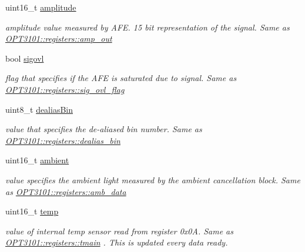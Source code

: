 \begin{DoxyCompactItemize}
uint16\+\_\+t \mbox{\hyperlink{class_o_p_t3101_1_1frame_data_a16b903f0cea13dc66d751beab7271a18}{amplitude}}
\begin{DoxyCompactList}\small\item\em amplitude value measured by A\+FE. 15 bit representation of the signal. Same as \mbox{\hyperlink{class_o_p_t3101_1_1registers_a09663efd977de72bdf7820e0a8f92390}{O\+P\+T3101\+::registers\+::amp\+\_\+out}} \end{DoxyCompactList}\item 
bool \mbox{\hyperlink{class_o_p_t3101_1_1frame_data_a5fde4a7c755e99367d2fc79feb51cf1b}{sigovl}}
\begin{DoxyCompactList}\small\item\em flag that specifies if the A\+FE is saturated due to signal. Same as \mbox{\hyperlink{class_o_p_t3101_1_1registers_ad767a496a0cad5741d575a54a095add3}{O\+P\+T3101\+::registers\+::sig\+\_\+ovl\+\_\+flag}} \end{DoxyCompactList}\item 
uint8\+\_\+t \mbox{\hyperlink{class_o_p_t3101_1_1frame_data_ab29ea3b01c14d5fab239039a61ca4594}{dealias\+Bin}}
\begin{DoxyCompactList}\small\item\em value that specifies the de-\/aliased bin number. Same as \mbox{\hyperlink{class_o_p_t3101_1_1registers_a1faab11698859e9d42e148c1d8cd5d1e}{O\+P\+T3101\+::registers\+::dealias\+\_\+bin}} \end{DoxyCompactList}\item 
uint16\+\_\+t \mbox{\hyperlink{class_o_p_t3101_1_1frame_data_a39ebf8bd06141bef6986e49013d03c35}{ambient}}
\begin{DoxyCompactList}\small\item\em value specifies the ambient light measured by the ambient cancellation block. Same as \mbox{\hyperlink{class_o_p_t3101_1_1registers_ae6b7c86e96cbfb1efe3263caed9de137}{O\+P\+T3101\+::registers\+::amb\+\_\+data}} \end{DoxyCompactList}\item 
uint16\+\_\+t \mbox{\hyperlink{class_o_p_t3101_1_1frame_data_a537975687785cc0fb002dc70384af7ab}{temp}}
\begin{DoxyCompactList}\small\item\em value of internal temp sensor read from register 0x0A. Same as \mbox{\hyperlink{class_o_p_t3101_1_1registers_a3dfd8d81d4cb04d274007deb7c6122fc}{O\+P\+T3101\+::registers\+::tmain}} . This is updated every data ready. \end{DoxyCompactList}\item 

\end{DoxyCompactItemize}
